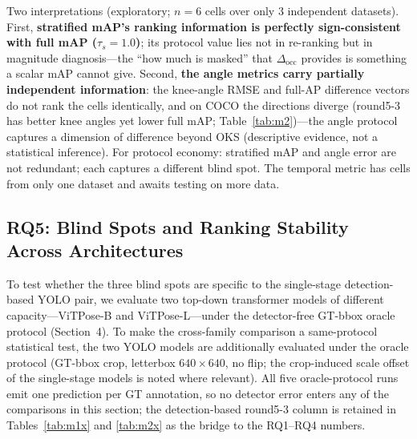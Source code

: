 \documentclass[10pt,conference]{IEEEtran}
\begin{document}
Two interpretations (exploratory; $n=6$ cells over only 3 independent datasets). First, \textbf{stratified mAP's ranking information is perfectly sign-consistent with full mAP ($\tau_s=1.0$)}; its protocol value lies not in re-ranking but in magnitude diagnosis---the ``how much is masked'' that $\Delta_{\mathrm{occ}}$ provides is something a scalar mAP cannot give. Second, \textbf{the angle metrics carry partially independent information}: the knee-angle RMSE and full-AP difference vectors do not rank the cells identically, and on COCO the directions diverge (round5-3 has better knee angles yet lower full mAP; Table~\ref{tab:m2})---the angle protocol captures a dimension of difference beyond OKS (descriptive evidence, not a statistical inference). For protocol economy: stratified mAP and angle error are not redundant; each captures a different blind spot. The temporal metric has cells from only one dataset and awaits testing on more data.

\subsection{RQ5: Blind Spots and Ranking Stability Across Architectures}

To test whether the three blind spots are specific to the single-stage detection-based YOLO pair, we evaluate two top-down transformer models of different capacity---ViTPose-B and ViTPose-L---under the detector-free GT-bbox oracle protocol (Section~4). To make the cross-family comparison a same-protocol statistical test, the two YOLO models are additionally evaluated under the oracle protocol (GT-bbox crop, letterbox $640\times640$, no flip; the crop-induced scale offset of the single-stage models is noted where relevant). All five oracle-protocol runs emit one prediction per GT annotation, so no detector error enters any of the comparisons in this section; the detection-based round5-3 column is retained in Tables~\ref{tab:m1x} and \ref{tab:m2x} as the bridge to the RQ1--RQ4 numbers.
\end{document}
